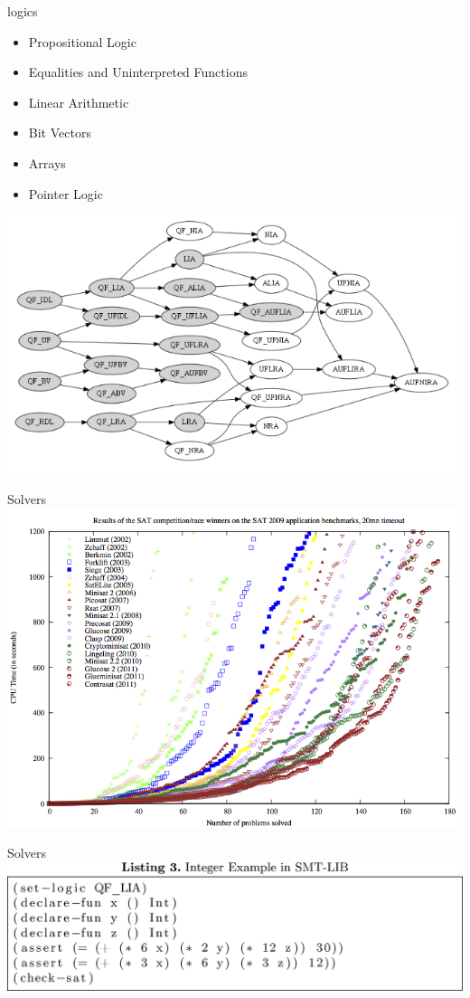 \documentclass[mathserif]{beamer}
\begin{document}
\begin{frame}{logics}
\begin{itemize}
\item Propositional Logic
\item Equalities and Uninterpreted Functions
\item Linear Arithmetic
\item Bit Vectors
\item Arrays
\item Pointer Logic
\end{itemize}
\includegraphics[scale=0.4]{logics.png}
\end{frame}

\begin{frame}{Solvers}
\includegraphics[scale=0.4]{SAT_results.png}
\end{frame}

\begin{frame}{Solvers}
\includegraphics[scale=1.0]{SMT-LIB.png}
\end{frame}
\end{document}
